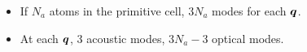 \begin{frame}
\begin{center}
{
    }
  \end{center}

  \medskip
  
  \begin{multicols}{2}
  \begin{itemize}
  \justifying\small
  \item If $N_a$ atoms in the primitive cell, $3N_a$ modes for each $\boldsymbol{q}$.
    
  \item At each $\boldsymbol{q}$, 3 acoustic modes, $3N_a - 3$ optical modes.
  \end{itemize}
  \end{multicols}
\end{frame}

